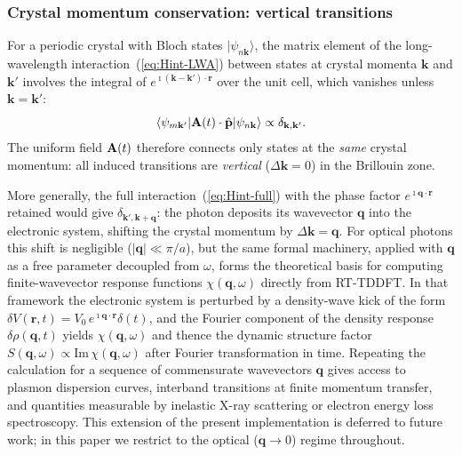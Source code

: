 \subsubsection{Crystal momentum conservation: vertical transitions}
\label{sec:vertical}

For a periodic crystal with Bloch states
$|\psi_{n\mathbf{k}}\rangle$, the matrix element of the
long-wavelength interaction~(\ref{eq:Hint-LWA}) between states at
crystal momenta $\mathbf{k}$ and $\mathbf{k}'$ involves the integral
of $e^{\imath(\mathbf{k}-\mathbf{k}')\cdot\mathbf{r}}$ over the unit
cell, which vanishes unless $\mathbf{k}=\mathbf{k}'$:
\begin{equation}
  \langle\psi_{m\mathbf{k}'}|
  \mathbf{A}(t)\cdot\hat{\mathbf{p}}
  |\psi_{n\mathbf{k}}\rangle
  \propto \delta_{\mathbf{k},\mathbf{k}'}.
  \label{eq:vertical}
\end{equation}
The uniform field $\mathbf{A}(t)$ therefore connects only states at the
\emph{same} crystal momentum: all induced transitions are
\emph{vertical} ($\Delta\mathbf{k}=0$) in the Brillouin zone.

More generally, the full interaction~(\ref{eq:Hint-full}) with the
phase factor $e^{\imath\mathbf{q}\cdot\mathbf{r}}$ retained would
give $\delta_{\mathbf{k}',\mathbf{k}+\mathbf{q}}$: the photon
deposits its wavevector $\mathbf{q}$ into the electronic system,
shifting the crystal momentum by $\Delta\mathbf{k}=\mathbf{q}$.
For optical photons this shift is negligible ($|\mathbf{q}|\ll\pi/a$),
but the same formal machinery, applied with $\mathbf{q}$ as a free
parameter decoupled from $\omega$, forms the theoretical basis for
computing finite-wavevector response functions
$\chi(\mathbf{q},\omega)$ directly from RT-TDDFT.\cite{yabana-bertsch-1996}
In that framework the electronic system is perturbed by a
density-wave kick of the form
$\delta V(\mathbf{r},t)=V_0\,e^{\imath\mathbf{q}\cdot\mathbf{r}}\delta(t)$,
and the Fourier component of the density response $\delta\rho(\mathbf{q},t)$
yields $\chi(\mathbf{q},\omega)$ and thence the dynamic structure
factor $S(\mathbf{q},\omega) \propto \mathrm{Im}\,\chi(\mathbf{q},\omega)$
after Fourier transformation in time.
Repeating the calculation for a sequence of commensurate wavevectors
$\mathbf{q}$ gives access to plasmon dispersion
curves,\cite{yabana-bertsch-1996} interband transitions at finite
momentum transfer, and quantities measurable by inelastic X-ray
scattering or electron energy loss
spectroscopy.
This extension of the present implementation is deferred to future
work; in this paper we restrict to the optical ($\mathbf{q}\to 0$)
regime throughout.

